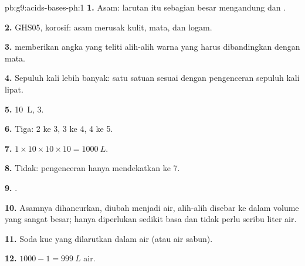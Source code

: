 \begin{solution}{pb:g9:acids-bases-ph:1}
\textbf{1.} Asam: larutan itu sebagian besar mengandung  
dan .

\textbf{2.} GHS05, korosif: asam merusak kulit, mata, dan logam.

\textbf{3.}  memberikan angka yang teliti alih-alih warna yang
harus dibandingkan dengan mata.

\textbf{4.} Sepuluh kali lebih banyak: satu satuan  sesuai dengan
pengenceran sepuluh kali lipat.

\textbf{5.} \qty{10}{L},  3.

\textbf{6.} Tiga:  2 ke 3, 3 ke 4, 4 ke 5.

\textbf{7.} $1 \times 10 \times 10 \times 10 = \qty{1000}{L}$.

\textbf{8.} Tidak: pengenceran hanya mendekatkan  ke 7.

\textbf{9.} .

\textbf{10.} Asamnya dihancurkan, diubah menjadi air, alih-alih disebar
ke dalam volume yang sangat besar; hanya diperlukan sedikit basa dan
tidak perlu seribu liter air.

\textbf{11.} Soda kue yang dilarutkan dalam air (atau air sabun).

\textbf{12.} $1000 - 1 = \qty{999}{L}$ air.
\end{solution}

